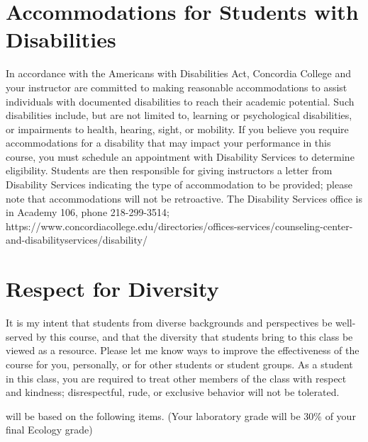 \documentclass{tufte-handout}
\begin{document}
\begin{fullwidth}
\section{Accommodations for Students with Disabilities}

In accordance with the Americans with Disabilities Act, Concordia College and your instructor are committed to making reasonable accommodations to assist individuals with documented disabilities to reach their academic potential. Such disabilities include, but are not limited to, learning or psychological disabilities, or impairments to health, hearing, sight, or mobility. If you believe you require accommodations for a disability that may impact your performance in this course, you must schedule an appointment with Disability Services to determine eligibility. Students are then responsible for giving instructors a letter from Disability Services indicating the type of accommodation to be provided; please note that accommodations will not be retroactive. The Disability Services office is in Academy 106, phone 218-299-3514; https://www.concordiacollege.edu/directories/offices-services/counseling-center-and-disabilityservices/disability/ 

\section{Respect for Diversity}

It is my intent that students from diverse backgrounds and perspectives be well-served by this course, and that the diversity that students bring to this class be viewed as a resource. Please let me know ways to improve the effectiveness of the course for you, personally, or for other students or student groups. As a student in this class, you are required to treat other members of the class with respect and kindness; disrespectful, rude, or exclusive behavior will not be tolerated.



\newpage 

 will be based on the following items. (Your laboratory grade will be 30\% of your final Ecology grade)	
				


\end{fullwidth}
\end{document}
